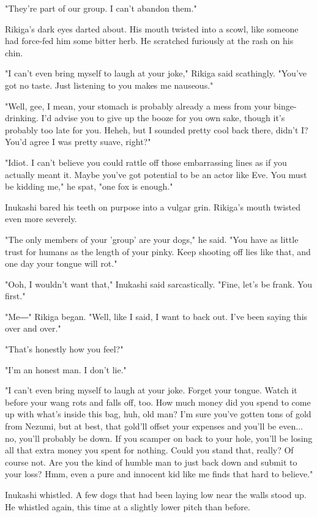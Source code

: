 "They're part of our group. I can't abandon them."

Rikiga's dark eyes darted about. His mouth twisted into a scowl, like
someone had force-fed him some bitter herb. He scratched furiously at
the rash on his chin.

"I can't even bring myself to laugh at your joke," Rikiga said
scathingly. "You've got no taste. Just listening to you makes me
nauseous."

"Well, gee, I mean, your stomach is probably already a mess from your
binge-drinking. I'd advise you to give up the booze for you own sake,
though it's probably too late for you. Heheh, but I sounded pretty cool
back there, didn't I? You'd agree I was pretty suave, right?"

"Idiot. I can't believe you could rattle off those embarrassing lines as
if you actually meant it. Maybe you've got potential to be an actor like
Eve. You must be kidding me," he spat, "one fox is enough."

Inukashi bared his teeth on purpose into a vulgar grin. Rikiga's mouth
twisted even more severely.

"The only members of your 'group' are your dogs," he said. "You have as
little trust for humans as the length of your pinky. Keep shooting off
lies like that, and one day your tongue will rot."

"Ooh, I wouldn't want that," Inukashi said sarcastically. "Fine, let's
be frank. You first."

"Me―" Rikiga began. "Well, like I said, I want to back out. I've been
saying this over and over."

"That's honestly how you feel?"

"I'm an honest man. I don't lie."

"I can't even bring myself to laugh at your joke. Forget your tongue.
Watch it before your wang rots and falls off, too. How much money did
you spend to come up with what's inside this bag, huh, old man? I'm sure
you've gotten tons of gold from Nezumi, but at best, that gold'll offset
your expenses and you'll be even... no, you'll probably be down. If you
scamper on back to your hole, you'll be losing all that extra money you
spent for nothing. Could you stand that, really? Of course not. Are you
the kind of humble man to just back down and submit to your loss? Hmm,
even a pure and innocent kid like me finds that hard to believe."

Inukashi whistled. A few dogs that had been laying low near the walls
stood up. He whistled again, this time at a slightly lower pitch than
before.

